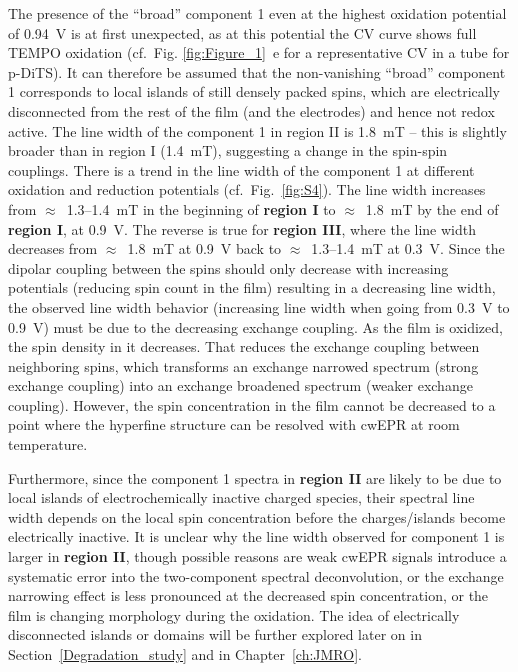 \par
The presence of the ``broad'' component 1 even at the highest oxidation potential of 0.94~V is at first unexpected, as at this potential the CV curve shows full TEMPO oxidation (cf.\ Fig. \ref{fig:Figure_1}~e for a representative CV in a tube for p-DiTS). It can therefore be assumed that the non-vanishing ``broad'' component 1 corresponds to local islands of still densely packed spins, which are electrically disconnected from the rest of the film (and the electrodes) and hence not redox active. The line width of the component 1 in region II is 1.8~mT -- this is slightly broader than in region I (1.4~mT), suggesting a change in the spin-spin couplings. There is a trend in the line width of the component 1 at different oxidation and reduction potentials (cf.\ Fig.~\ref{fig:S4}). The line width increases from $\approx$~1.3--1.4~mT in the beginning of \textbf{region I} to $\approx$~1.8~mT by the end of \textbf{region I}, at 0.9~V. The reverse is true for \textbf{region III}, where the line width decreases from $\approx$~1.8~mT at 0.9~V back to $\approx$~1.3--1.4~mT at 0.3~V. Since the dipolar coupling between the spins should only decrease with increasing potentials (reducing spin count in the film) resulting in a decreasing line width, the observed line width behavior (increasing line width when going from 0.3~V to 0.9~V) must be due to the decreasing exchange coupling. As the film is oxidized, the spin density in it decreases. That reduces the exchange coupling between neighboring spins, which transforms an exchange narrowed spectrum (strong exchange coupling) into an exchange broadened spectrum (weaker exchange coupling). However, the spin concentration in the film cannot be decreased to a point where the hyperfine structure can be resolved with cwEPR at room temperature.

\par
Furthermore, since the component 1 spectra in \textbf{region II} are likely to be due to local islands of electrochemically inactive charged species, their spectral line width depends on the local spin concentration before the charges/islands become electrically inactive. It is unclear why the line width observed for component 1 is larger in \textbf{region II}, though possible reasons are weak cwEPR signals introduce a systematic error into the two-component spectral deconvolution, or the exchange narrowing effect is less pronounced at the decreased spin concentration, or the film is changing morphology during the oxidation. The idea of electrically disconnected islands or domains will be further explored later on in Section~\ref{Degradation_study} and in Chapter~\ref{ch:JMRO}.

